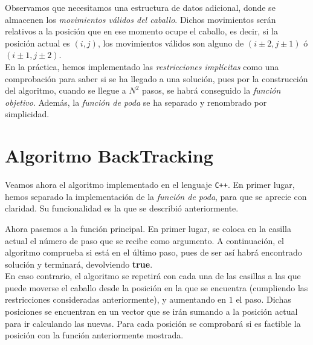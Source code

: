 \documentclass[11pt]{article}
\begin{document}
Observamos que necesitamos una estructura de datos adicional, donde se almacenen los \textit{movimientos válidos del caballo}. Dichos movimientos serán relativos a la posición que en ese momento ocupe el caballo, es decir, si la posición actual es $(i,j)$, los movimientos válidos son alguno de $(i \pm 2, j \pm 1)$ ó $(i \pm 1, j \pm 2)$.\\

En la práctica, hemos implementado las \textit{restricciones implícitas} como una comprobación para saber si se ha llegado a una solución, pues por la construcción del algoritmo, cuando se llegue a $N^2$ pasos, se habrá conseguido la \textit{función objetivo}. Además, la \textit{función de poda} se ha separado y renombrado por simplicidad.

\section*{Algoritmo BackTracking}

Veamos ahora el algoritmo implementado en el lenguaje \verb|C++|. En primer lugar, hemos separado la implementación de la \textit{función de poda}, para que se aprecie con claridad. Su funcionalidad es la que se describió anteriormente.

	
\vspace{1em}

Ahora pasemos a la función principal. En primer lugar, se coloca en la casilla actual el número de paso que se recibe como argumento. A continuación, el algoritmo comprueba si está en el último paso, pues de ser así habrá encontrado solución y terminará, devolviendo \textbf{true}.\\

En caso contrario, el algoritmo se repetirá con cada una de las casillas a las que puede moverse el caballo desde la posición en la que se encuentra (cumpliendo las restricciones consideradas anteriormente), y aumentando en $1$ el paso. Dichas posiciones se encuentran en un vector que se irán sumando a la posición actual para ir calculando las nuevas. Para cada posición se comprobará si es factible la posición con la función anteriormente mostrada.\\

	
	\vspace{1em}
\end{document}
